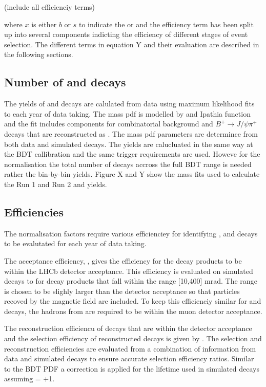 (include all efficienciy terms)

where $x$ is either $b$ or $s$ to indicate the \bs or \bd and the efficiency term has been split up into several components indicting the efficiency of different stages of event selection.  The different terms in equation Y and their evaluation are described in the following sections.


\subsection{Number of \bdkpi and \bujpsik decays}
The yields of \bujpsik and \bdkpi decays are calulated from data using maximum likelihood fits to each year of data taking. 
The \bujpsik mass pdf is modelled by and Ipathia function and the fit includes components for combinatorial background and $B^{+} \to J/\psi \pi^{+}$ decays that are reconstructed as \bukpsik. The mass pdf parameters are determince from both data and simulated decays. The \bdkpi yields are calucluated in the same way at the BDT callibration and the same trigger requirements are used. Howeve for the normalisation the total number of \bdkpi decays accross the full BDT range is needed rather the bin-by-bin yields. Figure X and Y show the mass fits used to calculate the Run 1 and Run 2 \bdkpi and \bujpsik yields.


\subsection{Efficiencies}
The normalisation factors require various efficienciey for identifying \bmumu, \bdkpi and \bujpsik decays to be evalutated for each year of data taking. %

The acceptance efficiency, , gives the efficiency for the decay products to be within the LHCb detector acceptance. This efficiency is evaluated on simulated decays to for decay products that fall within the range [10,400] mrad. The range is chosen to be slighly larger than the detector acceptance so that particles recoved by the magnetic field are included. To keep this efficienciy similar for \bmumu and \bdkpi decays, the hadrons from \bdkpi are required to be within the muon detector acceptance. 

The reconstruction efficiencu of decays that are within the detector acceptance and the selection efficiency of reconstructed decays is given by . The selection and reconstruction efficiencies are evaluated from a combination of information from data and simulated decays to ensure accurate selection efficiency ratios. Similar to the BDT PDF a correction is applied for the lifetime used in simulated \bsmumu decays assuming \ADG = +1. 


